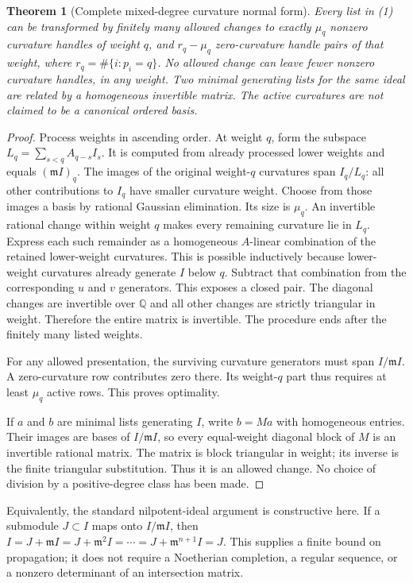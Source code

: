 \documentclass[11pt]{article}
\newtheorem{theorem}{Theorem}
\newcommand{\Q}{\mathbb Q}
\newcommand{\m}{\mathfrak m}
\begin{document}
\begin{theorem}[Complete mixed-degree curvature normal form]
Every list in (1) can be transformed by finitely many allowed changes to
exactly $\mu_q$ nonzero curvature handles of weight $q$, and
$r_q-\mu_q$ zero-curvature handle pairs of that weight, where
$r_q=\#\{i:p_i=q\}$. No allowed change can leave fewer nonzero curvature
handles, in any weight. Two minimal generating lists for the same ideal
are related by a homogeneous invertible matrix. The active curvatures are
not claimed to be a canonical ordered basis.
\end{theorem}
\begin{proof}
Process weights in ascending order. At weight $q$, form the subspace
$L_q=\sum_{s<q}A_{q-s}I_s$. It is computed from already processed lower
weights and equals $(\m I)_q$. The images of the original weight-$q$
curvatures span $I_q/L_q$: all other contributions to $I_q$ have smaller
curvature weight. Choose from those images a basis by rational Gaussian
elimination. Its size is $\mu_q$. An invertible rational change within
weight $q$ makes every remaining curvature lie in $L_q$. Express each
such remainder as a homogeneous $A$-linear combination of the retained
lower-weight curvatures. This is possible inductively because lower-weight
curvatures already generate $I$ below $q$. Subtract that combination from
the corresponding $u$ and $v$ generators. This exposes a closed pair.
The diagonal changes are invertible over $\Q$ and all other changes are
strictly triangular in weight. Therefore the entire matrix is invertible.
The procedure ends after the finitely many listed weights.

For any allowed presentation, the surviving curvature generators must
span $I/\m I$. A zero-curvature row contributes zero there. Its weight-$q$
part thus requires at least $\mu_q$ active rows. This proves optimality.

If $a$ and $b$ are minimal lists generating $I$, write $b=Ma$ with
homogeneous entries. Their images are bases of $I/\m I$, so every
equal-weight diagonal block of $M$ is an invertible rational matrix.
The matrix is block triangular in weight; its inverse is the finite
triangular substitution. Thus it is an allowed change. No choice of
division by a positive-degree class has been made.
\end{proof}

Equivalently, the standard nilpotent-ideal argument is constructive here.
If a submodule $J\subset I$ maps onto $I/\m I$, then
$I=J+\m I=J+\m^2I=\cdots=J+\m^{n+1}I=J$.
This supplies a finite bound on propagation; it does not require a
Noetherian completion, a regular sequence, or a nonzero determinant of
an intersection matrix.
\end{document}
